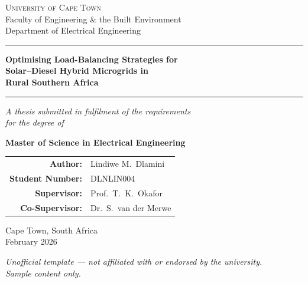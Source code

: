 \documentclass[12pt,a4paper]{report}
\begin{document}
\begin{titlepage}
\begin{center}

\vspace*{0.4cm}
{\small\color{uctslate}\scshape University of Cape Town}\\[2pt]
{\small\color{uctslate} Faculty of Engineering \& the Built Environment}\\
{\small\color{uctslate} Department of Electrical Engineering}

\vspace{1.4cm}
{\color{uctgold}\rule{0.5\textwidth}{1pt}}
\vspace{1.2cm}

{\Large\bfseries\color{uctblue}
Optimising Load-Balancing Strategies for\\
Solar--Diesel Hybrid Microgrids in\\
Rural Southern Africa
\par}

\vspace{1.2cm}
{\color{uctgold}\rule{0.5\textwidth}{1pt}}
\vspace{1.6cm}

{\normalsize\itshape A thesis submitted in fulfilment of the requirements\\
for the degree of}

\vspace{0.4cm}
{\large\bfseries\color{uctslate} Master of Science in Electrical Engineering}

\vspace{1.6cm}

\begin{tabular}{rl}
\textbf{Author:} & Lindiwe M.\ Dlamini \\[4pt]
\textbf{Student Number:} & DLNLIN004 \\[4pt]
\textbf{Supervisor:} & Prof.\ T.\ K.\ Okafor \\[4pt]
\textbf{Co-Supervisor:} & Dr.\ S.\ van der Merwe \\
\end{tabular}

\vspace{2.0cm}
{\normalsize Cape Town, South Africa}\\
{\normalsize February 2026}

\vfill
\begin{center}
\footnotesize\color{uctslate}
\textit{Unofficial template --- not affiliated with or endorsed by the university.\\
Sample content only.}
\end{center}

\end{center}
\end{titlepage}
\end{document}
